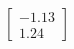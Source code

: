 \documentclass[preview]{standalone}
\begin{document}
\begin{align*}
\begin{bmatrix} -1.13 \\ 1.24 \end{bmatrix}
\end{align*}
\end{document}

